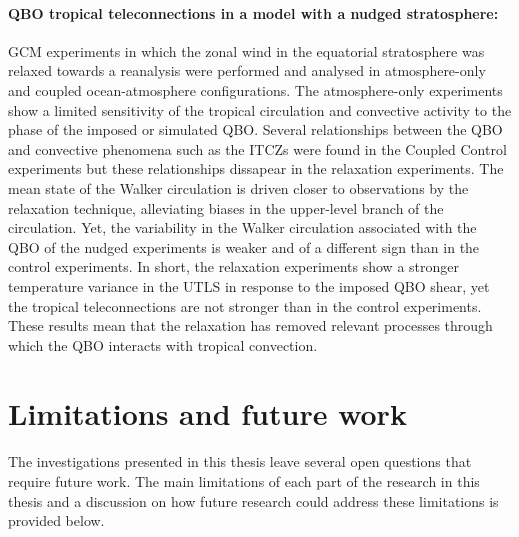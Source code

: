 \paragraph{QBO tropical teleconnections in a model with a nudged stratosphere:}
GCM experiments in which the zonal wind in the equatorial stratosphere was relaxed towards a reanalysis were performed and analysed in atmosphere-only and coupled ocean-atmosphere configurations. 
The atmosphere-only experiments show a limited sensitivity of the tropical circulation and convective activity to the phase of the imposed or simulated QBO.
Several relationships between the QBO and convective phenomena such as the ITCZs were found in the Coupled Control experiments but these relationships dissapear in the relaxation experiments.
The mean state of the Walker circulation is driven closer to observations by the relaxation technique, alleviating biases in the upper-level branch of the circulation. Yet, the variability in the Walker circulation associated with the QBO of the nudged experiments is weaker and of a different sign than in the control experiments.
In short, the relaxation experiments show a stronger temperature variance in the UTLS in response to the imposed QBO shear, yet the tropical teleconnections are not stronger than in the control experiments. These results mean that the relaxation has removed relevant processes through which the QBO interacts with tropical convection.


\section{Limitations and future work}

The investigations presented in this thesis leave several open questions that require future work. 
The main limitations of each part of the research in this thesis and a discussion on how future research could address these limitations is provided below. 


